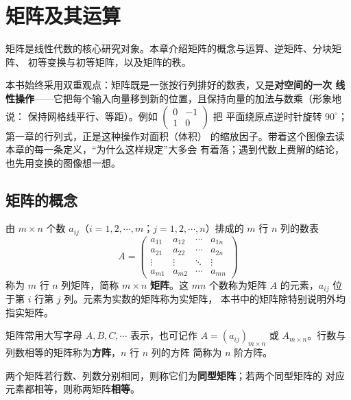 \chapter{矩阵及其运算}

矩阵是线性代数的核心研究对象。本章介绍矩阵的概念与运算、逆矩阵、分块矩阵、
初等变换与初等矩阵，以及矩阵的秩。

\begin{insight}
本书始终采用双重观点：矩阵既是一张按行列排好的数表，又是\textbf{对空间的一次
线性操作}——它把每个输入向量移到新的位置，且保持向量的加法与数乘（形象地说：
保持网格线平行、等距）。例如 $\begin{pmatrix} 0 & -1 \\ 1 & 0 \end{pmatrix}$ 把
平面绕原点逆时针旋转 $90^\circ$；第一章的行列式，正是这种操作对面积（体积）
的缩放因子。带着这个图像去读本章的每一条定义，“为什么这样规定”大多会
有着落；遇到代数上费解的结论，也先用变换的图像想一想。
\end{insight}

\section{矩阵的概念}

\begin{definition}\label{def:matrix}
由 $m\times n$ 个数 $a_{ij}$（$i=1,2,\cdots,m$；$j=1,2,\cdots,n$）排成的
$m$ 行 $n$ 列的数表
\[
  A=\begin{pmatrix}
    a_{11} & a_{12} & \cdots & a_{1n} \\
    a_{21} & a_{22} & \cdots & a_{2n} \\
    \vdots & \vdots & \ddots & \vdots \\
    a_{m1} & a_{m2} & \cdots & a_{mn}
  \end{pmatrix}
\]
称为 $m$ 行 $n$ 列矩阵，简称 $m\times n$ \textbf{矩阵}。这 $mn$ 个数称为矩阵
$A$ 的元素，$a_{ij}$ 位于第 $i$ 行第 $j$ 列。元素为实数的矩阵称为实矩阵，
本书中的矩阵除特别说明外均指实矩阵。
\end{definition}

矩阵常用大写字母 $A,B,C,\cdots$ 表示，也可记作 $A=(a_{ij})_{m\times n}$ 或
$A_{m\times n}$。行数与列数相等的矩阵称为\textbf{方阵}，$n$ 行 $n$ 列的方阵
简称为 $n$ 阶方阵。

两个矩阵若行数、列数分别相同，则称它们为\textbf{同型矩阵}；若两个同型矩阵的
对应元素都相等，则称两矩阵\textbf{相等}。

